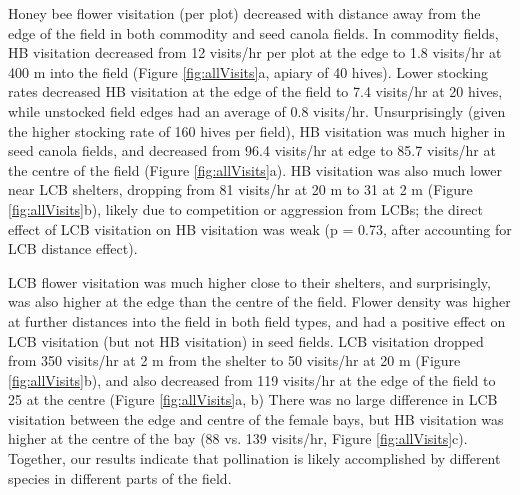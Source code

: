 \documentclass[12pt]{article} %
\begin{document}
Honey bee flower visitation (per plot) decreased with distance away from the edge of the field in both commodity and seed canola fields.
In commodity fields, HB visitation decreased from 12 visits/hr per plot at the edge to 1.8 visits/hr at 400 m into the field (Figure \ref{fig:allVisits}a, apiary of 40 hives).
Lower stocking rates decreased HB visitation at the edge of the field to 7.4 visits/hr at 20 hives, while unstocked field edges had an average of 0.8 visits/hr.
Unsurprisingly (given the higher stocking rate of 160 hives per field), HB visitation was much higher in seed canola fields, and decreased from 96.4 visits/hr at edge to 85.7 visits/hr at the centre of the field (Figure \ref{fig:allVisits}a). 
HB visitation was also much lower near LCB shelters, dropping from 81 visits/hr at 20 m to 31 at 2 m (Figure \ref{fig:allVisits}b), likely due to competition or aggression from LCBs; the direct effect of LCB visitation on HB visitation was weak (p = 0.73, after accounting for LCB distance effect).


LCB flower visitation was much higher close to their shelters, and surprisingly, was also higher at the edge than the centre of the field.
Flower density was higher at further distances into the field in both field types, and had a positive effect on LCB visitation (but not HB visitation) in seed fields.
LCB visitation dropped from 350 visits/hr at 2 m from the shelter to 50 visits/hr at 20 m (Figure \ref{fig:allVisits}b), and also decreased from 119 visits/hr at the edge of the field to 25 at the centre (Figure \ref{fig:allVisits}a, b)
There was no large difference in LCB visitation between the edge and centre of the female bays, but HB visitation was higher at the centre of the bay (88 vs. 139 visits/hr, Figure \ref{fig:allVisits}c).
Together, our results indicate that pollination is likely accomplished by different species in different parts of the field.
\end{document}
